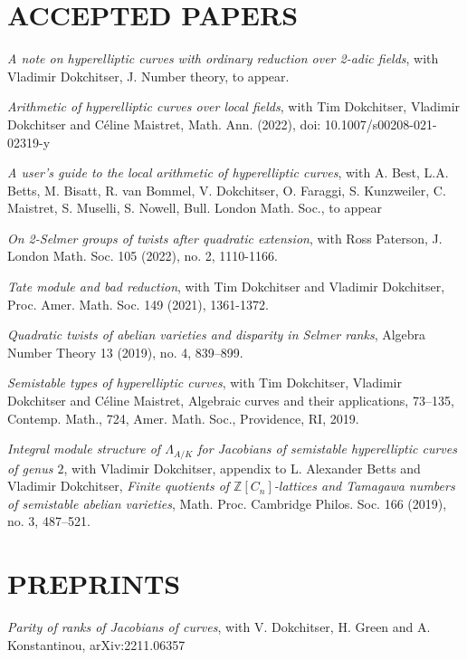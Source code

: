 \documentclass{res}
\begin{document}
\begin{resume}
\section{ACCEPTED PAPERS}         
        
\bigskip

\vspace{-0.1in}	
{\it A note on hyperelliptic curves with ordinary reduction over 2-adic fields}, with Vladimir Dokchitser, J. Number theory, to appear. \

\vspace{-0.1in}	
{\it Arithmetic of hyperelliptic curves over local fields}, with Tim Dokchitser, Vladimir Dokchitser and C\'{e}line Maistret, Math. Ann. (2022), doi: 10.1007/s00208-021-02319-y  \

{\it A user's guide to the local arithmetic of hyperelliptic curves}, with A. Best, L.A. Betts, M. Bisatt, R. van Bommel, V. Dokchitser, O. Faraggi, S. Kunzweiler, C. Maistret, S. Muselli, S. Nowell,  Bull. London Math. Soc., to appear

{\it On 2-Selmer groups of twists after quadratic extension}, with Ross Paterson, J. London Math. Soc. 105 (2022), no. 2, 1110-1166. \

{\it Tate module and bad reduction}, with Tim Dokchitser and Vladimir Dokchitser, Proc. Amer. Math. Soc. 149 (2021), 1361-1372.

{\it Quadratic twists of abelian varieties and disparity in Selmer ranks},  Algebra Number Theory 13 (2019), no. 4, 839–899. \

{\it Semistable types of hyperelliptic curves}, with Tim Dokchitser, Vladimir Dokchitser and C\'{e}line Maistret, Algebraic curves and their applications, 73–135, Contemp. Math., 724, Amer. Math. Soc., Providence, RI, 2019. \

   {\it Integral module structure of $\Lambda_{A/K}$ for Jacobians of
semistable hyperelliptic curves of genus $2$}, with Vladimir Dokchitser, appendix to L. Alexander Betts and Vladimir Dokchitser, {\it Finite quotients of  $\mathbb{Z}[C_n]$-lattices and Tamagawa numbers of semistable abelian varieties}, Math. Proc. Cambridge Philos. Soc. 166 (2019), no. 3, 487–521. 
%
\section{PREPRINTS}         
        
\bigskip

{\it Parity of ranks of Jacobians of curves}, with V. Dokchitser, H. Green and A. Konstantinou, arXiv:2211.06357   


\end{resume}
\end{document}
